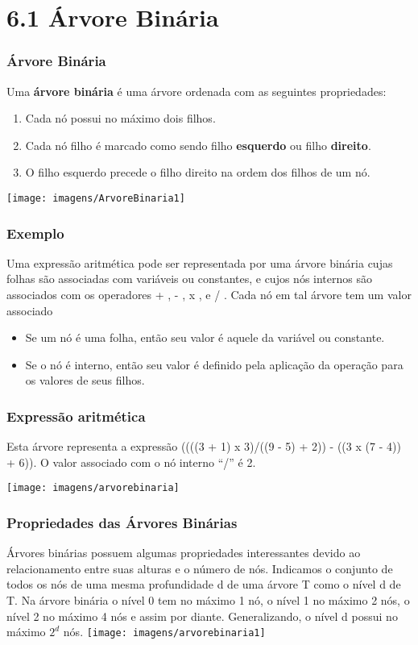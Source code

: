 \documentclass{beamer}
\begin{document}
\section{6.1 Árvore Binária}
\begin{frame}
\frametitle{Árvore Binária}

Uma \textbf{árvore binária} é uma árvore ordenada com as seguintes propriedades:
\begin{enumerate}
\item Cada nó possui no máximo dois filhos.
\item Cada nó filho é marcado como sendo filho \textbf{esquerdo} ou filho \textbf{direito}.
\item O filho esquerdo precede o filho direito na ordem dos filhos de um nó.
\end{enumerate}
\texttt{[image: imagens/ArvoreBinaria1]}
\end{frame}

\begin{frame}
\frametitle{Exemplo}

Uma expressão aritmética pode ser representada por uma árvore binária cujas folhas são associadas com variáveis ou constantes, e cujos nós internos são associados com os operadores  + , - , x , e / . Cada nó em tal árvore tem um valor associado
\begin{itemize}
\item Se um nó é uma folha, então seu valor é aquele da variável ou constante.
\item Se o nó é interno, então seu valor é definido pela aplicação da operação para os valores de seus filhos.
\end{itemize}
\end{frame}

\begin{frame}
\frametitle{Expressão aritmética}

Esta árvore representa a expressão ((((3 + 1) x 3)/((9 - 5) + 2)) - ((3 x (7 - 4)) + 6)). O valor associado com o nó interno  ``/'' é 2.

\texttt{[image: imagens/arvorebinaria]}
\end{frame}



\begin{frame}
\frametitle{Propriedades das Árvores Binárias}
Árvores binárias possuem algumas propriedades interessantes devido ao relacionamento entre suas alturas e o número de nós. Indicamos o conjunto de todos os nós de uma mesma profundidade d de uma árvore T como o nível d de T. Na árvore binária o nível 0 tem no máximo 1 nó, o nível 1 no máximo 2 nós, o nível 2 no máximo 4 nós e assim por diante. Generalizando, o nível d possui no máximo $2^d$ nós.
\texttt{[image: imagens/arvorebinaria1]}
\end{frame}
\end{document}
